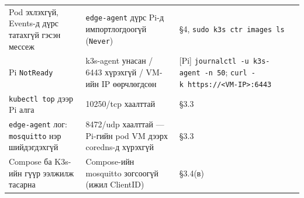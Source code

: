 \begin{longtable}[]{@{}lll@{}}
\begin{minipage}[t]{0.30\columnwidth}\raggedright
Pod эхлэхгүй, Events-д дүрс татахгүй гэсэн мессеж\strut
\end{minipage} & \begin{minipage}[t]{0.30\columnwidth}\raggedright
\texttt{edge-agent} дүрс Pi-д импортлогдоогүй (\texttt{Never})\strut
\end{minipage} & \begin{minipage}[t]{0.30\columnwidth}\raggedright
§4, \texttt{sudo\ k3s\ ctr\ images\ ls}\strut
\end{minipage}\tabularnewline
\begin{minipage}[t]{0.30\columnwidth}\raggedright
Pi \texttt{NotReady}\strut
\end{minipage} & \begin{minipage}[t]{0.30\columnwidth}\raggedright
k3s-agent унасан / 6443 хүрэхгүй / VM-ийн IP өөрчлөгдсөн\strut
\end{minipage} & \begin{minipage}[t]{0.30\columnwidth}\raggedright
{[}Pi{]} \texttt{journalctl\ -u\ k3s-agent\ -n\ 50}; \texttt{curl\ -k\ https:\allowbreak{}/\allowbreak{}/\allowbreak{}\textless{}VM-IP\textgreater{}:\allowbreak{}6443}\strut
\end{minipage}\tabularnewline
\begin{minipage}[t]{0.30\columnwidth}\raggedright
\texttt{kubectl\ top} дээр Pi алга\strut
\end{minipage} & \begin{minipage}[t]{0.30\columnwidth}\raggedright
10250/tcp хаалттай\strut
\end{minipage} & \begin{minipage}[t]{0.30\columnwidth}\raggedright
§3.3\strut
\end{minipage}\tabularnewline
\begin{minipage}[t]{0.30\columnwidth}\raggedright
\texttt{edge-agent} лог: \texttt{mosquitto} нэр шийдэгдэхгүй\strut
\end{minipage} & \begin{minipage}[t]{0.30\columnwidth}\raggedright
8472/udp хаалттай --- Pi-гийн pod VM дээрх coredns-д хүрэхгүй\strut
\end{minipage} & \begin{minipage}[t]{0.30\columnwidth}\raggedright
§3.3\strut
\end{minipage}\tabularnewline
\begin{minipage}[t]{0.30\columnwidth}\raggedright
Compose ба K3s-ийн гүүр ээлжилж тасарна\strut
\end{minipage} & \begin{minipage}[t]{0.30\columnwidth}\raggedright
Compose-ийн mosquitto зогсоогүй (ижил ClientID)\strut
\end{minipage} & \begin{minipage}[t]{0.30\columnwidth}\raggedright
§3.4(в)\strut
\end{minipage}\tabularnewline
\bottomrule
\end{longtable}\endgroup

